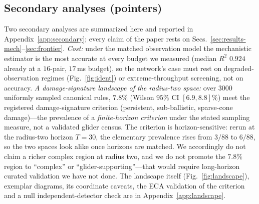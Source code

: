 \documentclass[aip,cha,amsmath,amssymb,reprint,floatfix]{revtex4-2}
\newcommand{\rtwo}{$R^2$}
\begin{document}
\begin{table}[t]
\caption{\emph{Exploratory} practitioner guidance, bounded to the evaluated
protocol: radius two, the fixed $80$-rule frontier panel, the exact
corruption distributions of Sec.~\ref{sec:identifiability}, and the
estimators actually tested. \textbf{Frontier \rtwo{} values are on the
reduced-budget scale} (ceiling median $0.953$; Appendix~\ref{app:methods})
and are \emph{not} comparable to the matched-regime numbers of
Table~\ref{tab:pertarget}; per-cell rule-bootstrap CIs accompany every
number in the released grid artifact. Each axis was swept singly; joint corruptions
were not tested and the per-axis recommendations are not established to
compose. ``Use'' means the named estimator won its cells under the
registered rules; ``none reliably recommendable'' is a claim about these
estimators, not all estimators. Do not extrapolate beyond the corruption
model, architecture, and training distribution evaluated---the frontier's
own lesson is that adaptation to the observation model decides these
races.}
\label{tab:guidance}
\end{table}

\subsection{Secondary analyses (pointers)}
\label{sec:constructive}

Two secondary analyses are summarized here and reported in
Appendix~\ref{app:secondary}; every claim of the paper rests on
Secs.~\ref{sec:results-mech}--\ref{sec:frontier}. \emph{Cost:} under the
matched observation model the mechanistic estimator is the most accurate at
every budget we measured (median \rtwo{} $0.924$ already at a $16$-pair,
$17$\,ms budget), so the network's case must rest on degraded-observation
regimes (Fig.~\ref{fig:ident}) or extreme-throughput screening, not on
accuracy. \emph{A damage-signature landscape of the radius-two space:} over
$3000$ uniformly sampled canonical rules, $7.8\%$ (Wilson $95\%$ CI
$[6.9,8.8]\%$) meet the registered damage-signature criterion (persistent,
sub-ballistic, sparse-cone damage)---the prevalence of a
\emph{finite-horizon criterion} under the stated sampling measure, not a
validated glider census. The criterion is horizon-sensitive: rerun at the
radius-two horizon $T=30$, the elementary prevalence rises from $3/88$ to
$6/88$, so the two spaces look alike once horizons are matched. We
accordingly do not claim a richer complex region at radius two, and we do
not promote the $7.8\%$ region to ``complex'' or
``glider-supporting''---that would require long-horizon curated validation
we have not done. The landscape itself (Fig.~\ref{fig:landscape}), exemplar
diagrams, its coordinate caveats, the ECA validation of the criterion and a
null independent-detector check are in Appendix~\ref{app:landscape}.
\end{document}
